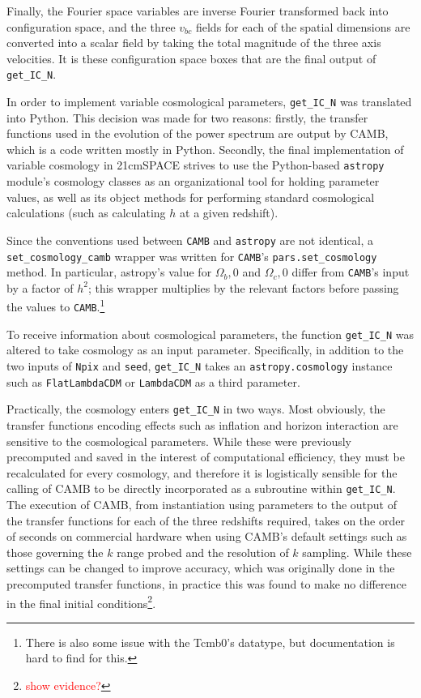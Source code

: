 \documentclass[floats,floatfix,showpacs,amssymb,prd,superscriptaddress,nofootinbib]{revtex4-2} %
\newcommand{\code}{\texttt}
\newcommand{\red}{\textcolor{red}}
\begin{document}
Finally, the Fourier space variables are inverse Fourier transformed back into configuration space, and the three $v_{bc}$ fields for each of the spatial dimensions are converted into a scalar field by taking the total magnitude of the three axis velocities. It is these configuration space boxes that are the final output of \code{get\_IC\_N}.

In order to implement variable cosmological parameters, \code{get\_IC\_N} was translated into Python. This decision was made for two reasons: firstly, the transfer functions used in the evolution of the power spectrum are output by CAMB, which is a code written mostly in Python. Secondly, the final implementation of variable cosmology in 21cmSPACE strives to use the Python-based \code{astropy} module's cosmology classes as an organizational tool for holding parameter values, as well as its object methods for performing standard cosmological calculations (such as calculating $h$ at a given redshift). 

Since the conventions used between \code{CAMB} and \code{astropy} are not identical, a \code{set\_cosmology\_camb} wrapper was written for \code{CAMB}'s \code{pars.set\_cosmology} method. In particular, astropy's value for $\Omega_b, 0$ and $\Omega_c, 0$ differ from \code{CAMB}'s input by a factor of $h^2$; this wrapper multiplies by the relevant factors before passing the values to \code{CAMB}.\footnote{There is also some issue with the Tcmb0's datatype, but documentation is hard to find for this.}

To receive information about cosmological parameters, the function \code{get\_IC\_N} was altered to take cosmology as an input parameter. Specifically, in addition to the two inputs of \code{Npix} and \code{seed}, \code{get\_IC\_N} takes an \code{astropy.cosmology} instance such as \code{FlatLambdaCDM} or \code{LambdaCDM} as a third parameter. 

Practically, the cosmology enters \code{get\_IC\_N} in two ways. Most obviously, the transfer functions encoding effects such as inflation and horizon interaction are sensitive to the cosmological parameters. While these were previously precomputed and saved in the interest of computational efficiency, they must be recalculated for every cosmology, and therefore it is logistically sensible for the calling of CAMB to be directly incorporated as a subroutine within \code{get\_IC\_N}. The execution of CAMB, from instantiation using parameters to the output of the transfer functions for each of the three redshifts required, takes on the order of seconds on commercial hardware when using CAMB's default settings such as those governing the $k$ range probed and the resolution of $k$ sampling. While these settings can be changed to improve accuracy, which was originally done in the precomputed transfer functions, in practice this was found to make no difference in the final initial conditions\footnote{\red{show evidence?}}.
\end{document}

